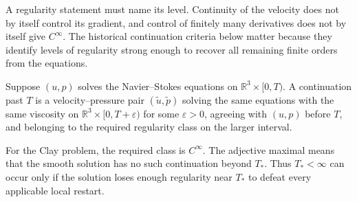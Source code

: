 A regularity statement must name its level.
Continuity of the velocity does not by itself control its gradient, and control of finitely many derivatives does not by itself give \(C^\infty\).
The historical continuation criteria below matter because they identify levels of regularity strong enough to recover all remaining finite orders from the equations.


\begin{definition}[Continuation]\label{def:Continuation}
Suppose \((u,p)\) solves the Navier--Stokes equations on \(\mathbb R^3\times[0,T)\).
A continuation past \(T\) is a velocity--pressure pair \((\widetilde u,\widetilde p)\) solving the same equations with the same viscosity on \(\mathbb R^3\times[0,T+\varepsilon)\) for some \(\varepsilon>0\), agreeing with \((u,p)\) before \(T\), and belonging to the required regularity class on the larger interval.
\end{definition}

For the Clay problem, the required class is \(C^\infty\).
The adjective maximal means that the smooth solution has no such continuation beyond \(T_*\).
Thus \(T_*<\infty\) can occur only if the solution loses enough regularity near \(T_*\) to defeat every applicable local restart.
